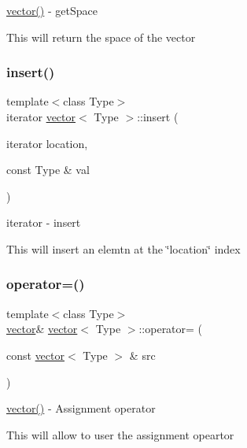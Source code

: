 \hyperlink{classvector_ab8d8ebaa9b91a05bb7a94371cb84c042}{vector()} -\/ get\+Space 

This will return the space of the vector \hypertarget{classvector_ae416d913721ccee87128230e0ff9a5fa}{}\label{classvector_ae416d913721ccee87128230e0ff9a5fa} 
\subsubsection{\texorpdfstring{insert()}{insert()}}
{\footnotesize\ttfamily template$<$class Type$>$ \\
iterator \hyperlink{classvector}{vector}$<$ Type $>$\+::insert (\begin{DoxyParamCaption}\item[{iterator}]{location,  }\item[{const Type \&}]{val }\end{DoxyParamCaption})\hspace{0.3cm}{\ttfamily [inline]}}



iterator -\/ insert 

This will insert an elemtn at the \char`\"{}location\char`\"{} index \hypertarget{classvector_a4de09f8f1844cead9daef18122e3cdf6}{}\label{classvector_a4de09f8f1844cead9daef18122e3cdf6} 
\subsubsection{\texorpdfstring{operator=()}{operator=()}\hspace{0.1cm}{\footnotesize\ttfamily [1/2]}}
{\footnotesize\ttfamily template$<$class Type$>$ \\
\hyperlink{classvector}{vector}\& \hyperlink{classvector}{vector}$<$ Type $>$\+::operator= (\begin{DoxyParamCaption}\item[{const \hyperlink{classvector}{vector}$<$ Type $>$ \&}]{src }\end{DoxyParamCaption})\hspace{0.3cm}{\ttfamily [inline]}}



\hyperlink{classvector_ab8d8ebaa9b91a05bb7a94371cb84c042}{vector()} -\/ Assignment operator 

This will allow to user the assignment opeartor \hypertarget{classvector_acbbf4dfffea32b7145d7bb24dd3a0df2}{}\label{classvector_acbbf4dfffea32b7145d7bb24dd3a0df2} 
